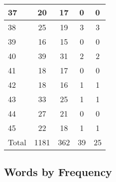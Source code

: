 \begin{center}
\begin{longtable}{l|c|c|c|c}
37 & 20 & 17 & 0 & 0\\ \hline
38 & 25 & 19 & 3 & 3\\ \hline
39 & 16 & 15 & 0 & 0\\ \hline
40 & 39 & 31 & 2 & 2\\ \hline
41 & 18 & 17 & 0 & 0\\ \hline
42 & 18 & 16 & 1 & 1\\ \hline
43 & 33 & 25 & 1 & 1\\ \hline
44 & 27 & 21 & 0 & 0\\ \hline
45 & 22 & 18 & 1 & 1\\ \hline
\hline \hline
Total & 1181 & 362 & 39 & 25



\end{longtable}
\end{center}

 
\subsection{Words by Frequency}

